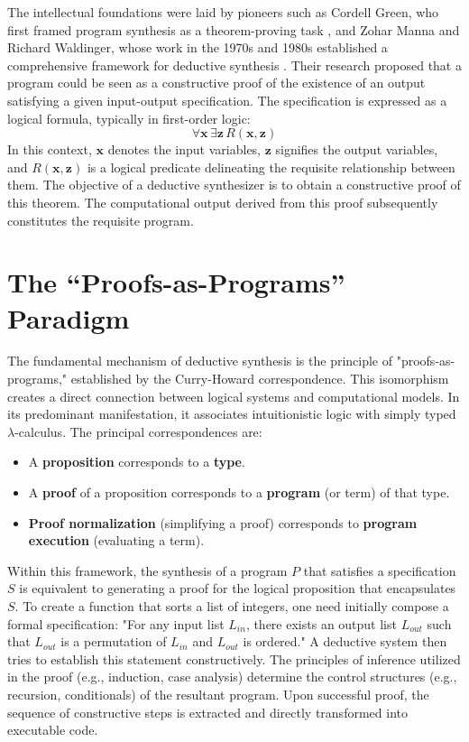 \documentclass[12pt, a4paper]{report}
\begin{document}
The intellectual foundations were laid by pioneers such as Cordell Green, who first framed program synthesis as a theorem-proving task \citep{green1969application}, and Zohar Manna and Richard Waldinger, whose work in the 1970s and 1980s established a comprehensive framework for deductive synthesis \citep{manna1980theory}. Their research proposed that a program could be seen as a constructive proof of the existence of an output satisfying a given input-output specification. The specification is expressed as a logical formula, typically in first-order logic:
$$ \forall \mathbf{x} \, \exists \mathbf{z} \, R(\mathbf{x}, \mathbf{z}) $$
In this context, $\mathbf{x}$ denotes the input variables, $\mathbf{z}$ signifies the output variables, and $R(\mathbf{x}, \mathbf{z})$ is a logical predicate delineating the requisite relationship between them.  The objective of a deductive synthesizer is to obtain a constructive proof of this theorem.  The computational output derived from this proof subsequently constitutes the requisite program.

\section{The ``Proofs-as-Programs'' Paradigm}

The fundamental mechanism of deductive synthesis is the principle of "proofs-as-programs," established by the Curry-Howard correspondence.  This isomorphism creates a direct connection between logical systems and computational models.  In its predominant manifestation, it associates intuitionistic logic with simply typed $\lambda$-calculus.  The principal correspondences are:

\begin{itemize}
    \item A \textbf{proposition} corresponds to a \textbf{type}.
    \item A \textbf{proof} of a proposition corresponds to a \textbf{program} (or term) of that type.
    \item \textbf{Proof normalization} (simplifying a proof) corresponds to \textbf{program execution} (evaluating a term).
\end{itemize}

Within this framework, the synthesis of a program $P$ that satisfies a specification $S$ is equivalent to generating a proof for the logical proposition that encapsulates $S$.  To create a function that sorts a list of integers, one need initially compose a formal specification: "For any input list $L_{in}$, there exists an output list $L_{out}$ such that $L_{out}$ is a permutation of $L_{in}$ and $L_{out}$ is ordered."  A deductive system then tries to establish this statement constructively.  The principles of inference utilized in the proof (e.g., induction, case analysis) determine the control structures (e.g., recursion, conditionals) of the resultant program.  Upon successful proof, the sequence of constructive steps is extracted and directly transformed into executable code.
\end{document}
